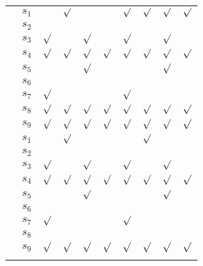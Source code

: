 \begin{table}[h!]
\begin{tabular}{c|c!{\vrule width 1.3pt}x{12mm}|x{12mm}|x{12mm}|x{12mm}!{\vrule width 1.3pt}x{12mm}|x{12mm}|x{12mm}|x{12mm}}
 &$s_1$&       &$\surd$&       &       &$\surd$&$\surd$&$\surd$&$\surd$ \\
 &$s_2$&       &       &       &       &       &       &       &        \\
 &$s_3$&$\surd$&       &$\surd$&       &$\surd$&       &$\surd$&        \\
 &$s_4$&$\surd$&$\surd$&$\surd$&$\surd$&$\surd$&$\surd$&$\surd$&$\surd$ \\
 &$s_5$&       &       &$\surd$&       &       &       &$\surd$&        \\
 &$s_6$&       &       &       &       &       &       &       &        \\
 &$s_7$&$\surd$&       &       &       &$\surd$&       &       &        \\
 &$s_8$&$\surd$&$\surd$&$\surd$&$\surd$&$\surd$&$\surd$&$\surd$&$\surd$ \\
 &$s_9$&$\surd$&$\surd$&$\surd$&$\surd$&$\surd$&$\surd$&$\surd$&$\surd$ \\[1mm]



 &$s_1$&       &$\surd$&       &       &       &$\surd$&       &        \\
 &$s_2$&       &       &       &       &       &       &       &        \\
 &$s_3$&$\surd$&       &$\surd$&       &$\surd$&       &$\surd$&        \\
 &$s_4$&$\surd$&$\surd$&$\surd$&$\surd$&$\surd$&$\surd$&$\surd$&$\surd$ \\
 &$s_5$&       &       &$\surd$&       &       &       &$\surd$&        \\
 &$s_6$&       &       &       &       &       &       &       &        \\
 &$s_7$&$\surd$&       &       &       &$\surd$&       &       &        \\
 &$s_8$&       &       &       &       &       &       &       &        \\
 &$s_9$&$\surd$&$\surd$&$\surd$&$\surd$&$\surd$&$\surd$&$\surd$&$\surd$ \\[1mm]



\end{tabular}
\end{table}
